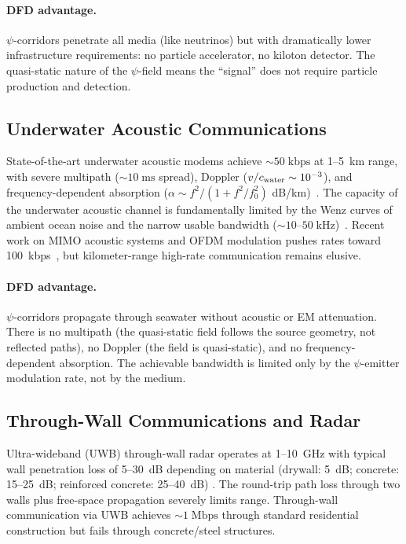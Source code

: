 \documentclass[twocolumn,superscriptaddress,prd,nofootinbib]{revtex4-2}
\begin{document}
\paragraph{DFD advantage.}
$\psi$-corridors penetrate all media (like neutrinos) but with
dramatically lower infrastructure requirements: no particle accelerator,
no kiloton detector. The quasi-static nature of the $\psi$-field means
the ``signal'' does not require particle production and detection.

\subsection{Underwater Acoustic Communications}

State-of-the-art underwater acoustic modems achieve
$\sim 50\;\text{kbps}$ at 1--5~km range, with severe multipath
($\sim 10\;\text{ms}$ spread), Doppler ($v/c_{\rm water} \sim 10^{-3}$),
and frequency-dependent absorption ($\alpha \sim f^2/(1+f^2/f_0^2)$
dB/km)~\cite{Stojanovic2009Underwater,Chitre2008Underwater}. The
capacity of the underwater acoustic channel is fundamentally limited by
the Wenz curves of ambient ocean noise and the narrow usable bandwidth
($\sim 10$--$50\;\text{kHz}$)~\cite{Ainslie2010Principles}.
Recent work on MIMO acoustic systems and OFDM modulation pushes rates
toward 100~kbps~\cite{Li2018MIMO_UW}, but kilometer-range high-rate
communication remains elusive.

\paragraph{DFD advantage.}
$\psi$-corridors propagate through seawater without acoustic or EM
attenuation. There is no multipath (the quasi-static field follows the
source geometry, not reflected paths), no Doppler (the field is
quasi-static), and no frequency-dependent absorption. The achievable
bandwidth is limited only by the $\psi$-emitter modulation rate, not by
the medium.

\subsection{Through-Wall Communications and Radar}

Ultra-wideband (UWB) through-wall radar operates at 1--10~GHz with
typical wall penetration loss of 5--30~dB depending on material
(drywall: 5~dB; concrete: 15--25~dB; reinforced concrete: 25--40~dB)
\cite{Amin2011ThroughWall,Ahmad2012ThroughWall}. The round-trip path
loss through two walls plus free-space propagation severely limits
range. Through-wall communication via UWB achieves $\sim 1\;\text{Mbps}$
through standard residential construction but fails through
concrete/steel structures.
\end{document}
